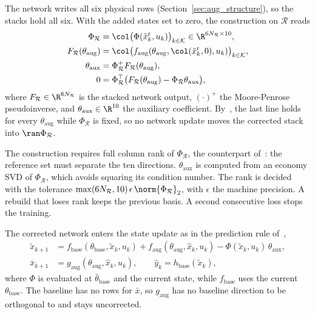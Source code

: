 The network writes all six physical rows (Section~\ref{sec:aug_structure}),
so the stacks hold all six.
With the added states set to zero, the construction on $\mathcal R$ reads
\begin{equation}
\begin{aligned}
 \Phi_{\mathcal R}&=\col\bigl(\Phi(\tilde x^{\mathrm r}_k,u_k)\bigr)_{k\in\mathcal K}
 \in\R^{6N_{\mathcal R}\times10},\\
 F_{\mathcal R}(\theta_{\mathrm{aug}})&=\col\bigl(f_{\mathrm{aug}}(\theta_{\mathrm{aug}},
 \col(\tilde x^{\mathrm r}_k,0),u_k)\bigr)_{k\in\mathcal K},\\
 \theta_{\mathrm{aux}}&=\Phi_{\mathcal R}^{+}F_{\mathcal R}(\theta_{\mathrm{aug}}),\\
 0&=\Phi_{\mathcal R}^{\top}\bigl(F_{\mathcal R}(\theta_{\mathrm{aug}})
 -\Phi_{\mathcal R}\theta_{\mathrm{aux}}\bigr),
\end{aligned}
\label{eq:obc_coef}
\end{equation}
where $F_{\mathcal R}\in\R^{6N_{\mathcal R}}$ is the stacked network output,
$(\cdot)^{+}$ the Moore-Penrose pseudoinverse, and
$\theta_{\mathrm{aux}}\in\R^{10}$ the auxiliary coefficient.
By~\cite[Lemma~3]{gyorok2026obc}, the last line holds for every
$\theta_{\mathrm{aug}}$ while $\Phi_{\mathcal R}$ is fixed, so no network
update moves the corrected stack into $\ran\Phi_{\mathcal R}$.

The construction requires full column rank of $\Phi_{\mathcal R}$, the
counterpart of~\cite[Assumption~1]{gyorok2026obc}: the reference set must
separate the ten directions.
$\theta_{\mathrm{aux}}$ is computed from an economy SVD of
$\Phi_{\mathcal R}$, which avoids squaring its condition number.
The rank is decided with the tolerance
$\max(6N_{\mathcal R},10)\,\epsilon\,\norm{\Phi_{\mathcal R}}_2$, with
$\epsilon$ the machine precision.
A rebuild that loses rank keeps the previous basis.
A second consecutive loss stops the training.

The corrected network enters the state update as in the prediction rule
of~\cite[Eq.~(13)]{gyorok2026obc},
\begin{equation}
\begin{aligned}
 \tilde x_{k+1}&=f_{\mathrm{base}}(\theta_{\mathrm{base}},\tilde x_k,u_k)
 +f_{\mathrm{aug}}(\theta_{\mathrm{aug}},\hat x_k,u_k)
 -\Phi(\tilde x_k,u_k)\,\theta_{\mathrm{aux}},\\
 \bar x_{k+1}&=g_{\mathrm{aug}}(\theta_{\mathrm{aug}},\hat x_k,u_k),\qquad
 \hat y_k=h_{\mathrm{base}}(\tilde x_k),
\end{aligned}
\label{eq:obc_model}
\end{equation}
where $\Phi$ is evaluated at $\bar\theta_{\mathrm{base}}$ and the current
state, while $f_{\mathrm{base}}$ uses the current $\theta_{\mathrm{base}}$.
The baseline has no rows for $\bar x$, so $g_{\mathrm{aug}}$ has no baseline
direction to be orthogonal to and stays uncorrected.

